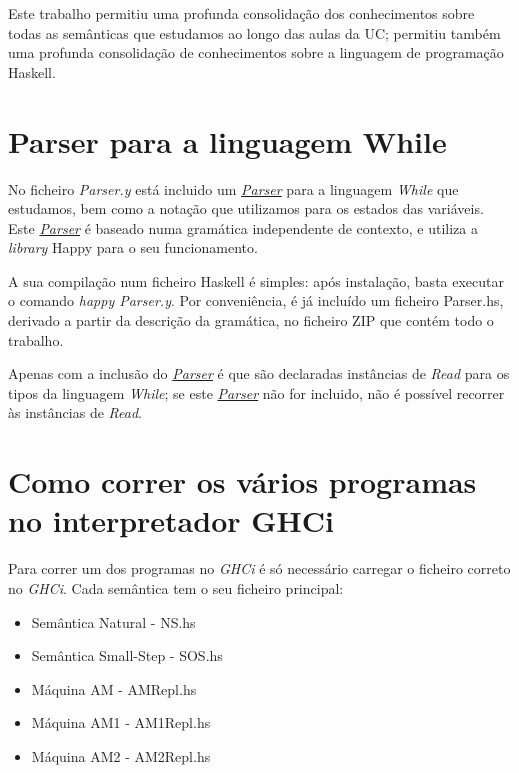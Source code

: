 \documentclass[11pt,a4paper]{report}
\newcommand{\while}[0]{\textit{While}\xspace}
\newcommand{\ghci}[0]{\textit{GHCi}\xspace}
\newcommand{\parser}[0]{\hyperref[appendix:parser]{\textit{Parser}}\xspace}
\newcommand{\classread}[0]{\textit{Read}\xspace}
\begin{document}
\par Este trabalho permitiu uma profunda consolidação dos conhecimentos sobre todas as semânticas que estudamos ao longo das aulas da UC; permitiu também uma profunda consolidação de conhecimentos sobre a linguagem de programação Haskell.

\appendix \label{appendix}


\chapter{Parser para a linguagem While} \label{appendix:parser}

\par No ficheiro \textit{Parser.y} está incluido um \parser para a linguagem \while que estudamos, bem como a notação que utilizamos para os estados das variáveis. Este \parser é baseado numa gramática independente de contexto, e utiliza a \textit{library} Happy para o seu funcionamento.

\par A sua compilação num ficheiro Haskell é simples: após instalação, basta executar o comando \textit{happy Parser.y}. Por conveniência, é já incluído um ficheiro Parser.hs, derivado a partir da descrição da gramática, no ficheiro ZIP que contém todo o trabalho.

\par Apenas com a inclusão do \parser é que são declaradas instâncias de \classread para os tipos da linguagem \while; se este \parser não for incluido, não é possível recorrer às instâncias de \classread.

\chapter{Como correr os vários programas no interpretador GHCi} \label{appendix:interpretador}

\par Para correr um dos programas no \ghci é só necessário carregar o ficheiro correto no \ghci. Cada semântica tem o seu ficheiro principal:

\begin{itemize}
    \item Semântica Natural - NS.hs
    \item Semântica Small-Step - SOS.hs
    \item Máquina AM - AMRepl.hs
    \item Máquina AM1 - AM1Repl.hs
    \item Máquina AM2 - AM2Repl.hs
\end{itemize}
\end{document}

